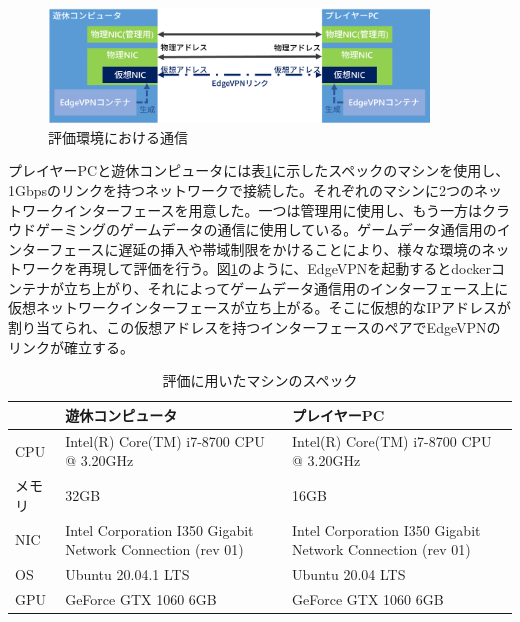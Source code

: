 \begin{figure}[t]
    \centering
    \includegraphics[width=0.9\textwidth,keepaspectratio,clip]{img/nic.eps}
    \caption{評価環境における通信}
    \label{fig:nic}
\end{figure}

プレイヤーPCと遊休コンピュータには表\ref{tab:spec}に示したスペックのマシンを使用し、1Gbpsのリンクを持つネットワークで接続した。それぞれのマシンに2つのネットワークインターフェースを用意した。一つは管理用に使用し、もう一方はクラウドゲーミングのゲームデータの通信に使用している。ゲームデータ通信用のインターフェースに遅延の挿入や帯域制限をかけることにより、様々な環境のネットワークを再現して評価を行う。図\ref{fig:nic}のように、EdgeVPNを起動するとdockerコンテナが立ち上がり、それによってゲームデータ通信用のインターフェース上に仮想ネットワークインターフェースが立ち上がる。そこに仮想的なIPアドレスが割り当てられ、この仮想アドレスを持つインターフェースのペアでEdgeVPNのリンクが確立する。

\begin{table}[t]
    \caption{評価に用いたマシンのスペック}
    \begin{tabularx}{\textwidth}{|l|X|X|}
        \hline
        & 遊休コンピュータ                                                   & プレイヤーPC                                                    \\ \hline
        CPU & Intel(R) Core(TM) i7-8700 CPU @ 3.20GHz                    & Intel(R) Core(TM) i7-8700 CPU @ 3.20GHz                    \\ \hline
        メモリ & 32GB                                                       & 16GB                                                       \\ \hline
        NIC & Intel Corporation I350 Gigabit Network Connection (rev 01) & Intel Corporation I350 Gigabit Network Connection (rev 01) \\ \hline
        OS  & Ubuntu 20.04.1 LTS                                         & Ubuntu 20.04 LTS                                           \\ \hline
        GPU & GeForce GTX 1060 6GB                                       & GeForce GTX 1060 6GB                                       \\ \hline
    \end{tabularx}
    \label{tab:spec}
\end{table}

